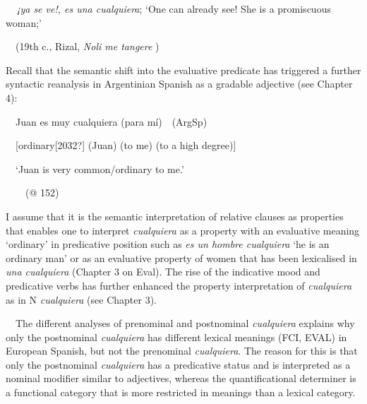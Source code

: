 \begin{styleStandard}
\textbf{\ \ }\textit{¡ya se ve!, es una cualquiera};\newline
‘One can already see! She is a promiscuous woman;’ 
\end{styleStandard}

\begin{styleStandard}
\ \ (19th c., Rizal,\textit{ Noli me tangere} )
\end{styleStandard}

\begin{styleStandard}
Recall that the semantic shift into the evaluative predicate has triggered a further syntactic reanalysis in Argentinian Spanish as a gradable adjective (see Chapter 4):
\end{styleStandard}

\begin{styleStandard}
\ \ Juan es muy cualquiera (para mí)\ \ (ArgSp)
\end{styleStandard}

\begin{styleStandard}
\ \ [ordinary[2032?] (Juan) (to me) (to a high degree)]\ \ 
\end{styleStandard}

\begin{styleStandard}
\ \ ‘Juan is very common/ordinary to me.’\ \ 
\end{styleStandard}

\begin{styleStandard}
\ \ \ \ (@ 152)
\end{styleStandard}

\begin{styleStandard}
I assume that it is the semantic interpretation of relative clauses as properties that enables one to interpret \textit{cualquiera} as a property with an evaluative meaning ‘ordinary’ in predicative position such as \textit{es un hombre cualquiera} ‘he is an ordinary man’ or as an evaluative property of women that has been lexicalised in \textit{una cualquiera} (Chapter 3 on Eval). The rise of the indicative mood and predicative verbs has further enhanced the property interpretation of \textit{cualquiera} as in N \textit{cualquiera} (see Chapter 3). 
\end{styleStandard}

\begin{styleStandard}
\ \ The different analyses of prenominal and postnominal \textit{cualquiera} explains why only the postnominal \textit{cualquiera} has different lexical meanings (FCI, EVAL) in European Spanish, but not the prenominal \textit{cualquiera}. The reason for this is that only the postnominal \textit{cualquiera} has a predicative status and is interpreted as a nominal modifier similar to adjectives, whereas the quantificational determiner is a functional category that is more restricted in meanings than a lexical category.
\end{styleStandard}

